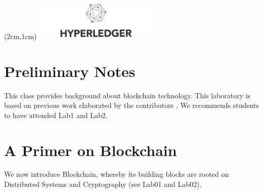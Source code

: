 \documentclass[12pt,a4paper]{article}
\theoremstyle{definition}
\begin{document}
\textblockorigin{-34pt}{-12pt}
\begin{textblock*}{10cm}(2cm,1cm)
\includegraphics[width=6cm]{hyperledger.png}
\end{textblock*}

\section*{Preliminary Notes}
This class provides background about blockchain technology. This laboratory is based on previous work elaborated by the contributors \cite{belchior2019_audits,belchior2020,belchior2019_thesis}. We recommends students to have attended Lab1 and Lab2.






\section{A Primer on Blockchain}
We now introduce Blockchain, whereby its building blocks are rooted on Distributed Systems and Cryptography (see Lab01 and Lab02). 

\end{document}
